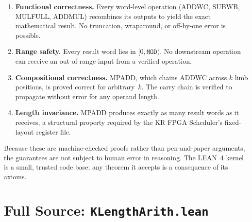 \documentclass[11pt,a4paper]{article}
\begin{document}
\begin{enumerate}[nosep]
\item \textbf{Functional correctness.}  Every word-level operation
  (ADDWC, SUBWB, MULFULL, ADDMUL) recombines its outputs to yield the
  exact mathematical result.  No truncation, wraparound, or
  off-by-one error is possible.

\item \textbf{Range safety.}  Every result word lies in
  $[0, \mathtt{MOD})$.  No downstream operation can receive an
  out-of-range input from a verified operation.

\item \textbf{Compositional correctness.}  MPADD, which chains ADDWC
  across $k$ limb positions, is proved correct for arbitrary~$k$.
  The carry chain is verified to propagate without error for any
  operand length.

\item \textbf{Length invariance.}  MPADD produces exactly as many
  result words as it receives, a structural property required by the
  KR FPGA Scheduler's fixed-layout register file.
\end{enumerate}

Because these are machine-checked proofs rather than pen-and-paper
arguments, the guarantees are not subject to human error in
reasoning.  The LEAN~4 kernel is a small, trusted code base;
any theorem it accepts is a consequence of its axioms.

\appendix
\section{Full Source: \texttt{KLengthArith.lean}}
\label{app:arith}
\end{document}
